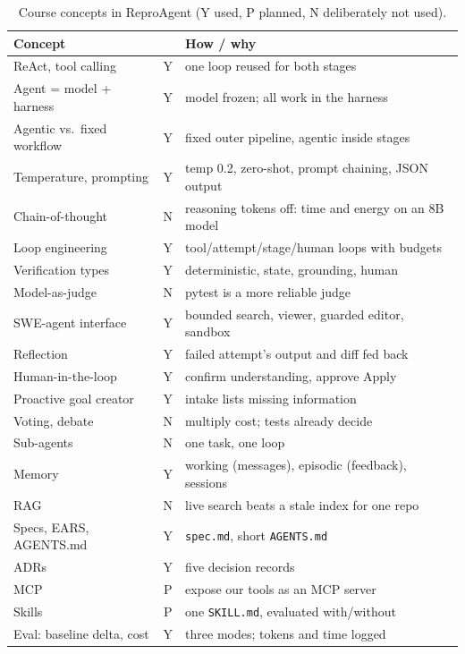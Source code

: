 \documentclass[manuscript,screen,nonacm]{acmart}
\begin{document}
\begin{table}[t]
\caption{Course concepts in ReproAgent (Y used, P planned, N deliberately not used).}
\label{tab:concepts}
\footnotesize
\begin{tabular}{@{}p{2.6cm}cp{4.6cm}@{}}
\toprule
Concept & & How / why \\
\midrule
ReAct, tool calling & Y & one loop reused for both stages \\
Agent = model + harness & Y & model frozen; all work in the harness \\
Agentic vs.\ fixed workflow & Y & fixed outer pipeline, agentic inside stages \\
Temperature, prompting & Y & temp 0.2, zero-shot, prompt chaining, JSON output \\
Chain-of-thought & N & reasoning tokens off: time and energy on an 8B model \\
Loop engineering & Y & tool/attempt/stage/human loops with budgets \\
Verification types & Y & deterministic, state, grounding, human \\
Model-as-judge & N & pytest is a more reliable judge \\
SWE-agent interface & Y & bounded search, viewer, guarded editor, sandbox \\
Reflection & Y & failed attempt's output and diff fed back \\
Human-in-the-loop & Y & confirm understanding, approve Apply \\
Proactive goal creator & Y & intake lists missing information \\
Voting, debate & N & multiply cost; tests already decide \\
Sub-agents & N & one task, one loop \\
Memory & Y & working (messages), episodic (feedback), sessions \\
RAG & N & live search beats a stale index for one repo \\
Specs, EARS, AGENTS.md & Y & \texttt{spec.md}, short \texttt{AGENTS.md} \\
ADRs & Y & five decision records \\
MCP & P & expose our tools as an MCP server \\
Skills & P & one \texttt{SKILL.md}, evaluated with/without \\
Eval: baseline delta, cost & Y & three modes; tokens and time logged \\
\bottomrule
\end{tabular}
\end{table}
\end{document}
